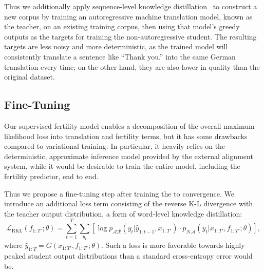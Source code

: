 Thus we additionally apply sequence-level knowledge distillation~\citep{kim2016sequence} to construct a new corpus by training an autoregressive machine translation model, known as the teacher, on an existing training corpus, then using that model's greedy outputs as the targets for training the non-autoregressive student. The resulting targets are less noisy and more deterministic, as the trained model will consistently translate a sentence like ``Thank you.'' into the same German translation every time; on the other hand, they are also lower in quality than the original dataset.


\subsection{Fine-Tuning}
Our supervised fertility model enables a decomposition of the overall maximum likelihood loss into translation and fertility terms, but it has some drawbacks compared to variational training.
In particular, it heavily relies on the deterministic, approximate inference model provided by the external alignment system, while it would be desirable to train the entire model, including the fertility predictor, end to end.

Thus we propose a fine-tuning step after training the \model{} to convergence. We introduce an additional loss term consisting of the reverse K-L divergence with the teacher output distribution, a form of word-level knowledge distillation:
\begin{equation}
\mathcal{L}_\text{RKL}\left(f_{1:T'}; \theta \right)=  \sum_{t=1}^T\sum_{y_t}\left[\log p_{\mathcal{AR}}\left(y_t|\hat{y}_{1:t-1}, x_{1:T'}\right)\cdot p_{\mathcal{NA}}\left(y_t|x_{1:T'}, f_{1:T'}; \theta \right)\right],
\label{eq.soft-conceptual}
\end{equation}
where $\hat{y}_{1:T}=G(x_{1:T'}, f_{1:T'};\theta)$. Such a loss is more favorable towards highly peaked student output distributions than a standard cross-entropy error would be.

